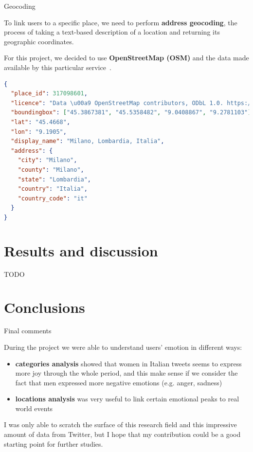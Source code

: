 \documentclass[8pt]{beamer}  %
\begin{document}
\begin{frame}[fragile]{Geocoding}
    
    To link users to a specific place, we need to perform \textbf{address geocoding}, the process of taking a text-based description of a location and returning its geographic coordinates.
    
    For this project, we decided to use \textbf{OpenStreetMap (OSM)} and the data made available by this particular service~\autocite{osm}.
    
\begin{lstlisting}[language=json, caption={Json object returned by Geopy given “Milano, Lombardia” as input}, captionpos=b, label={lst:nominatim-geocode}]
{
  "place_id": 317098601, 
  "licence": "Data \u00a9 OpenStreetMap contributors, ODbL 1.0. https://osm.org/copyright",
  "boundingbox": ["45.3867381", "45.5358482", "9.0408867", "9.2781103"], 
  "lat": "45.4668", 
  "lon": "9.1905", 
  "display_name": "Milano, Lombardia, Italia",
  "address": {
    "city": "Milano", 
    "county": "Milano",
    "state": "Lombardia", 
    "country": "Italia", 
    "country_code": "it"
  }
}
\end{lstlisting}
    
\end{frame}

\section{Results and discussion}

\begin{frame}{TODO}
    
\end{frame}

\section{Conclusions}

\begin{frame}{Final comments}
    
    During the project we were able to understand users' emotion in different ways:
    
    \begin{itemize}
        \item \textbf{categories analysis} showed that women in Italian tweets seems to express more joy through the whole period, and this make sense if we consider the fact that men expressed more negative emotions (e.g. anger, sadness)
        \item \textbf{locations analysis} was very useful to link certain emotional peaks to real world events
    \end{itemize}
    
    I was only able to scratch the surface of this research field and this impressive amount of data from Twitter, but I hope that my contribution could be a good starting point for further studies. 
    
\end{frame}
\end{document}

